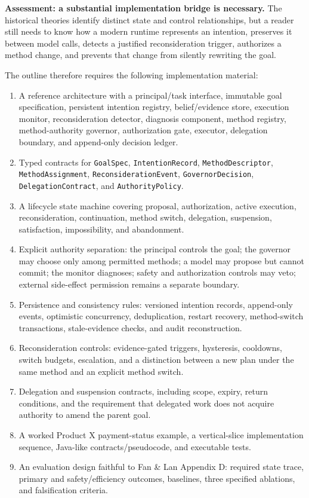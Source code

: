 \textbf{Assessment: a substantial implementation bridge is necessary.} The historical theories identify distinct state and control relationships, but a reader still needs to know how a modern runtime represents an intention, preserves it between model calls, detects a justified reconsideration trigger, authorizes a method change, and prevents that change from silently rewriting the goal.

The outline therefore requires the following implementation material:

\begin{enumerate}
\def\labelenumi{\arabic{enumi}.}
\tightlist
\item
  A reference architecture with a principal/task interface, immutable goal specification, persistent intention registry, belief/evidence store, execution monitor, reconsideration detector, diagnosis component, method registry, method-authority governor, authorization gate, executor, delegation boundary, and append-only decision ledger.
\item
  Typed contracts for \texttt{GoalSpec}, \texttt{IntentionRecord}, \texttt{MethodDescriptor}, \texttt{MethodAssignment}, \texttt{ReconsiderationEvent}, \texttt{GovernorDecision}, \texttt{DelegationContract}, and \texttt{AuthorityPolicy}.
\item
  A lifecycle state machine covering proposal, authorization, active execution, reconsideration, continuation, method switch, delegation, suspension, satisfaction, impossibility, and abandonment.
\item
  Explicit authority separation: the principal controls the goal; the governor may choose only among permitted methods; a model may propose but cannot commit; the monitor diagnoses; safety and authorization controls may veto; external side-effect permission remains a separate boundary.
\item
  Persistence and consistency rules: versioned intention records, append-only events, optimistic concurrency, deduplication, restart recovery, method-switch transactions, stale-evidence checks, and audit reconstruction.
\item
  Reconsideration controls: evidence-gated triggers, hysteresis, cooldowns, switch budgets, escalation, and a distinction between a new plan under the same method and an explicit method switch.
\item
  Delegation and suspension contracts, including scope, expiry, return conditions, and the requirement that delegated work does not acquire authority to amend the parent goal.
\item
  A worked Product X payment-status example, a vertical-slice implementation sequence, Java-like contracts/pseudocode, and executable tests.
\item
  An evaluation design faithful to Fan \& Lan Appendix D: required state trace, primary and safety/efficiency outcomes, baselines, three specified ablations, and falsification criteria.
\end{enumerate}


